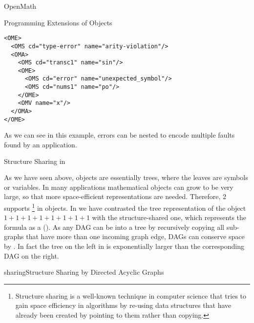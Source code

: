 \begin{omgroup}[id=mobj,short=Mathematical Objects]
\begin{omgroup}[id=openmath]{OpenMath}
\begin{module}[id=OpenMath]
\begin{omgroup}[id=om.error]{Programming Extensions of {\openmath} Objects}
\begin{lstlisting}[label=ome,language=OpenMath,numbers=none,index={OME}]
<OME>
  <OMS cd="type-error" name="arity-violation"/>
  <OMA>
    <OMS cd="transc1" name="sin"/>
    <OME>
      <OMS cd="error" name="unexpected_symbol"/>
      <OMS cd="nums1" name="po"/>
    </OME>
    <OMV name="x"/>
  </OMA>
</OME>
\end{lstlisting}
  As we can see in this example, errors can be nested to encode multiple faults found by
  an {\openmath} application.
\end{omgroup}

\begin{omgroup}[id=om.structure-sharing]{Structure Sharing in {\openmath}}

  As we have seen above, {\openmath} objects are essentially trees, where the leaves are
  symbols or variables. In many applications mathematical objects can grow to be very
  large, so that more space-efficient representations are needed. Therefore, {\openmath}2
  supports {}\footnote{Structure sharing is a well-known
    technique in computer science that tries to gain space efficiency in algorithms by
    re-using data structures that have already been created by pointing to them rather
    than copying.} in {\openmath} objects. In {} we have contrasted the
  tree representation of the object $1+1+1+1+1+1+1+1$ with the structure-shared one, which
  represents the formula as a {} (). As
  any DAG can be  into a tree by recursively copying all
  sub-graphs that have more than one incoming graph edge, DAGs can conserve space by
  {}. In fact the tree on the left in {} is
  exponentially larger than the corresponding DAG on the right.

\begin{myfig}{sharing}{Structure Sharing by Directed Acyclic Graphs}
\end{myfig}
\end{omgroup}
\end{module}
\end{omgroup}
\end{omgroup}
